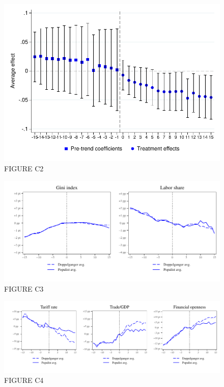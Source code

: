 \documentclass{article}
\begin{document}
\clearpage

\begin{figure}	
	\caption{FIGURE C2} 
		\includegraphics[scale=0.8]{FigureC2}\centering	
\end{figure}

\clearpage

\begin{figure}	
	\caption{FIGURE C3} 
		\includegraphics[scale=0.8]{FigureC3}\centering	
\end{figure}

\clearpage

\begin{figure}	
	\caption{FIGURE C4} 
		\includegraphics[scale=0.8]{FigureC4}\centering	
\end{figure}
\end{document}
